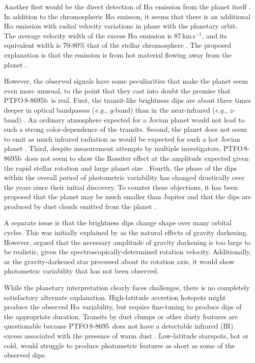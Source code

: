 \documentclass[12pt,twocolumn,tighten]{aastex62}
\newcommand{\ptfo}{PTFO$\,$8-8695}
\newcommand{\ptfob}{PTFO$\,$8-8695b}
\begin{document}
Another first would be the direct detection of H$\alpha$ emission from
the planet itself \citep{johnskrull_h_2016}.  In addition to the
chromospheric H$\alpha$ emisson, it seems that there is an additional
H$\alpha$ emission with radial velocity variations in phase with the
planetary orbit.  The average velocity width of the excess H$\alpha$
emission is 87$\,$km$\,$s$^{-1}$, and its equivalent width is 70-80\%
that of the stellar chromosphere \citep{johnskrull_h_2016}.  The
proposed explanation is that the emission is from hot material flowing
away from the planet \citep{johnskrull_h_2016}.

However, the observed signals have some peculiarities that make the
planet seem even more unusual, to the point that they cast into doubt
the premise that \ptfob\ is real.  First, the transit-like brightness
dips are about three times deeper in optical bandpasses ({\it e.g.,}
$g$-band) than in the near-infrared ({\it e.g.}, $z$-band)
\citep{onitsuka_multicolor_2017,tanimoto_evidence_2020}.  An ordinary
atmosphere expected for a Jovian planet would not lead to such a
strong color-dependence of the transits.  Second, the planet does not
seem to emit as much infrared radiation as would be expected for such
a hot Jovian planet \citep{yu_tests_2015}.  Third, despite measurement
attempts by multiple investigators, \ptfob\ does not seem to show the
Rossiter effect at the amplitude expected given the rapid stellar
rotation and large planet size
\citep{yu_tests_2015,ciardi_followup_2015}.  Fourth, the phase of the
dips within the overall period of photometric variability has changed
drastically over the years since their initial discovery.  To counter
these objections, it has been proposed that the planet may be much
smaller than Jupiter and that the dips are produced by dust clouds
emitted from the planet \citep{tanimoto_evidence_2020}. 

A separate issue is that the brightness dips change shape over many
orbital cycles. This was initially explained by
\cite{barnes_measurement_2013} as the natural effects of gravity
darkening.  However, \cite{howarth_reappraisal_2016} argued that the
necessary amplitude of gravity darkening is too large to be realistic,
given the spectroscopically-determined rotation velocity.
Additionally, as the gravity-darkened star precessed about its
rotation axis, it would show photometric variability that has not been
observed.

While the planetary interpretation clearly faces challenges, there is
no completely satisfactory alternate explanation.  High-latitude
accretion hotspots might produce the observed H$\alpha$ variability,
but require fine-tuning to produce dips of the appropriate duration.
Transits by dust clumps or other dusty features are questionable
because \ptfo\ does not have a detectable infrared (IR) excess
associated with the presence of warm dust \citep[{\it
e.g.},][Figure~18]{yu_tests_2015}.  Low-latitude starspots, hot or
cold, would struggle to produce photometric features as short as some
of the observed dips.
\end{document}
